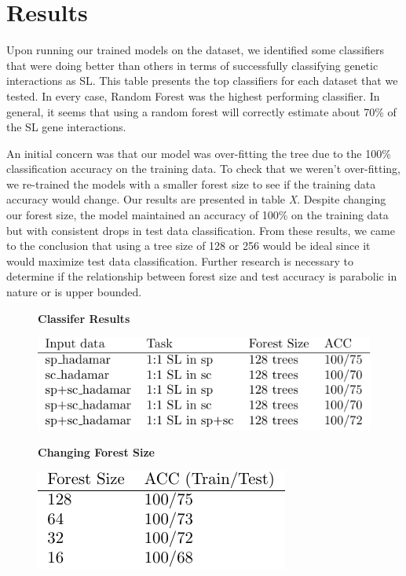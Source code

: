 \newcommand*{\figuretitle}[1]{%
    {\centering%
    \textbf{#1}%
    \par\medskip}%
}

\section{Results}
\label{sec:validation}

Upon running our trained models on the dataset, we identified some classifiers that were doing
better than others in terms of successfully classifying genetic interactions as SL. This table
presents the top classifiers for each dataset that we tested. In every case, Random Forest was the
highest performing classifier. In general, it seems that using a random forest will correctly
estimate about 70\% of the SL gene interactions. 

An initial concern was that our model was over-fitting the tree due to the 100\%
classification accuracy on the training data. To check that we weren't over-fitting, we re-trained
the models with a smaller forest size to see if the training data accuracy would change. Our
results are presented in table \emph{X}. Despite changing our forest size, the model maintained an
accuracy of 100\% on the training data but with consistent drops in test data classification. From
these results, we came to the conclusion that using a tree size of 128 or 256 would be ideal since
it would maximize test data classification. Further research is necessary to determine if the
relationship between forest size and test accuracy is parabolic in nature or is upper bounded. 

\begin{figure}[t!]
\centering
%
\figuretitle{Classifer Results}
\includegraphics[width=.48\textwidth]{figs/best-class}
%
\end{figure}



\begin{figure}[t!]
\centering
%
\figuretitle{Changing Forest Size}
\includegraphics[width=.38\textwidth]{figs/forest-size}
%
\end{figure}

